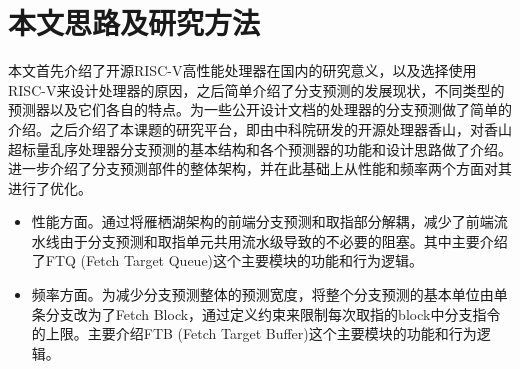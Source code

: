 



\section{本文思路及研究方法}

本文首先介绍了开源RISC-V高性能处理器在国内的研究意义，以及选择使用RISC-V来设计处理器的原因，之后简单介绍了分支预测的发展现状，不同类型的预测器以及它们各自的特点。为一些公开设计文档的处理器的分支预测做了简单的介绍。之后介绍了本课题的研究平台，即由中科院研发的开源处理器香山，对香山超标量乱序处理器分支预测的基本结构和各个预测器的功能和设计思路做了介绍。进一步介绍了分支预测部件的整体架构，并在此基础上从性能和频率两个方面对其进行了优化。

\begin{itemize}
	\item 性能方面。通过将雁栖湖架构的前端分支预测和取指部分解耦，减少了前端流水线由于分支预测和取指单元共用流水级导致的不必要的阻塞。其中主要介绍了FTQ (Fetch Target Queue)这个主要模块的功能和行为逻辑。
	\item 频率方面。为减少分支预测整体的预测宽度，将整个分支预测的基本单位由单条分支改为了Fetch Block，通过定义约束来限制每次取指的block中分支指令的上限。主要介绍FTB (Fetch Target Buffer)这个主要模块的功能和行为逻辑。
\end{itemize}


